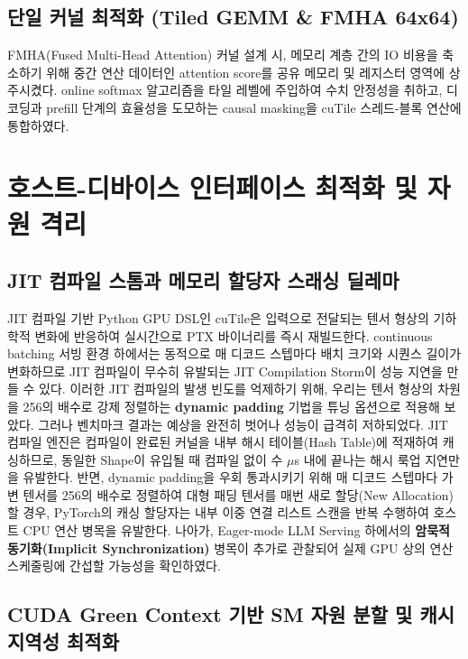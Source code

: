 \documentclass{kcc} %
\begin{document}
\subsection{단일 커널 최적화 (Tiled GEMM \& FMHA 64x64)}

FMHA(Fused Multi-Head Attention) 커널 설계 시, 메모리 계층 간의 IO 비용을 축소하기 위해 중간 연산 데이터인 attention score를 공유 메모리 및 레지스터 영역에 상주시켰다. online softmax 알고리즘을 타일 레벨에 주입하여 수치 안정성을 취하고, 디코딩과 prefill 단계의 효율성을 도모하는 causal masking을 cuTile 스레드-블록 연산에 통합하였다.


\section{호스트-디바이스 인터페이스 최적화 및 자원 격리}

\subsection{JIT 컴파일 스톰과 메모리 할당자 스래싱 딜레마}

JIT 컴파일 기반 Python GPU DSL인 cuTile은 입력으로 전달되는 텐서 형상의 기하학적 변화에 반응하여 실시간으로 PTX 바이너리를 즉시 재빌드한다. continuous batching 서빙 환경 하에서는 동적으로 매 디코드 스텝마다 배치 크기와 시퀀스 길이가 변화하므로 JIT 컴파일이 무수히 유발되는 JIT Compilation Storm이 성능 지연을 만들 수 있다. 이러한 JIT 컴파일의 발생 빈도를 억제하기 위해, 우리는 텐서 형상의 차원을 256의 배수로 강제 정렬하는 \textbf{dynamic padding} 기법을 튜닝 옵션으로 적용해 보았다. 그러나 벤치마크 결과는 예상을 완전히 벗어나 성능이 급격히 저하되었다. JIT 컴파일 엔진은 컴파일이 완료된 커널을 내부 해시 테이블(Hash Table)에 적재하여 캐싱하므로, 동일한 Shape이 유입될 때 컴파일 없이 수 $\mu$s 내에 끝나는 해시 룩업 지연만을 유발한다. 반면, dynamic padding을 우회 통과시키기 위해 매 디코드 스텝마다 가변 텐서를 256의 배수로 정렬하여 대형 패딩 텐서를 매번 새로 할당(New Allocation)할 경우, PyTorch의 캐싱 할당자는 내부 이중 연결 리스트 스캔을 반복 수행하여 호스트 CPU 연산 병목을 유발한다. 나아가, Eager-mode LLM Serving 하에서의 \textbf{암묵적 동기화(Implicit Synchronization)} 병목이 추가로 관찰되어 실제 GPU 상의 연산 스케줄링에 간섭할 가능성을 확인하였다.


\subsection{CUDA Green Context 기반 SM 자원 분할 및 캐시 지역성 최적화}
\end{document}
